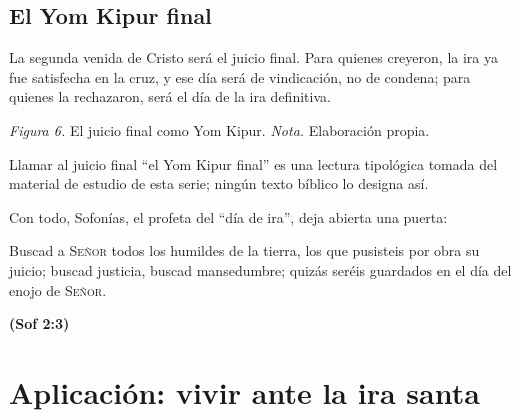 \documentclass[11pt,letterpaper]{article}
\newcommand{\SENOR}{\textsc{Señor}}
\newcommand{\fuente}[1]{\par\hfill{\upshape\bfseries\small\textcolor{azul}{#1}}}
\begin{document}
\subsection{El Yom Kipur final}
La segunda venida de Cristo será el juicio final. Para quienes creyeron, la ira ya fue satisfecha en la cruz, y ese día será de vindicación, no de condena; para quienes la rechazaron, será el día de la ira definitiva.

\begin{center}
\par
{\footnotesize\color{gris}\textit{Figura 6.} El juicio final como Yom Kipur. \textit{Nota.} Elaboración propia.}
\end{center}

\begin{nota}[Precisión]
Llamar al juicio final ``el Yom Kipur final'' es una lectura tipológica tomada del material de estudio de esta serie; ningún texto bíblico lo designa así.
\end{nota}

Con todo, Sofonías, el profeta del ``día de ira'', deja abierta una puerta:

\begin{cita}Buscad a \SENOR{} todos los humildes de la tierra, los que pusisteis por obra su juicio; buscad justicia, buscad mansedumbre; quizás seréis guardados en el día del enojo de \SENOR.\fuente{(Sof 2:3)}\end{cita}

\section{Aplicación: vivir ante la ira santa}
\end{document}
